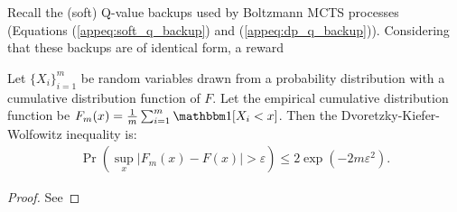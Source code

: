             Recall the (soft) Q-value backups used by Boltzmann MCTS processes (Equations (\ref{appeq:soft_q_backup}) and (\ref{appeq:dp_q_backup})). Considering that these backups are of identical form, a reward  
    
    
    
    
    
    
            
        
            \begin{theorem} \label{thrm:dkw_inequality}
                Let $\{X_i\}_{i=1}^m$ be random variables drawn from a probability distribution with a cumulative distribution function of $F$. Let the empirical cumulative distribution function be $F_m(x)=\frac{1}{m} \sum_{i=1}^m \one[X_i < x]$. Then the Dvoretzky-Kiefer-Wolfowitz inequality is:
                \begin{align}
                    \Pr\left(\sup_x |F_m(x)-F(x)| > \varepsilon\right) \leq 2\exp\left(-2m\varepsilon^2\right).
                \end{align}
            \end{theorem}
            \begin{proof}
                See %
            \end{proof}
    
    
    
    
    
    
    
            
        
